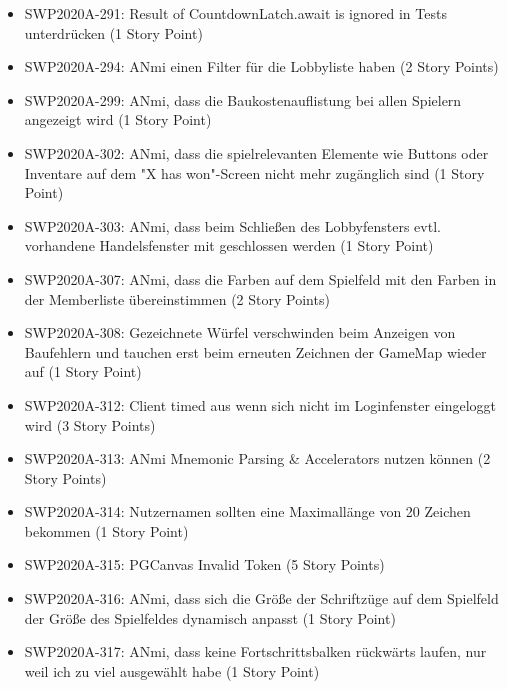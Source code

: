 \documentclass[12pt,a4paper, oneside]{article}
\begin{document}
\begin{itemize}
        \item SWP2020A-291:    \glqq Result of CountdownLatch.await is ignored \grqq{} in Tests unterdrücken (1 Story Point)

        \item SWP2020A-294: ANmi einen Filter für die Lobbyliste haben (2 Story Points)

        \item SWP2020A-299: ANmi, dass die Baukostenauflistung bei allen Spielern angezeigt wird (1 Story Point)

        \item SWP2020A-302: ANmi, dass die spielrelevanten Elemente wie Buttons oder Inventare auf dem "X has won"-Screen nicht mehr zugänglich sind (1 Story Point)

        \item SWP2020A-303: ANmi, dass beim Schließen des Lobbyfensters evtl. vorhandene Handelsfenster mit geschlossen werden (1 Story Point)

        \item SWP2020A-307: ANmi, dass die Farben auf dem Spielfeld mit den Farben in der Memberliste übereinstimmen (2 Story Points)

        \item SWP2020A-308: Gezeichnete Würfel verschwinden beim Anzeigen von Baufehlern und tauchen erst beim erneuten Zeichnen der GameMap wieder auf (1 Story Point)

        \item SWP2020A-312: Client timed aus wenn sich nicht im Loginfenster eingeloggt wird (3 Story Points)

        \item SWP2020A-313: ANmi Mnemonic Parsing & Accelerators nutzen können (2 Story Points)

        \item SWP2020A-314: Nutzernamen sollten eine Maximallänge von 20 Zeichen bekommen (1 Story Point)

        \item SWP2020A-315: PGCanvas Invalid Token (5 Story Points)

        \item SWP2020A-316: ANmi, dass sich die Größe der Schriftzüge auf dem Spielfeld der Größe des Spielfeldes dynamisch anpasst (1 Story Point)

        \item SWP2020A-317: ANmi, dass keine Fortschrittsbalken rückwärts laufen, nur weil ich zu viel ausgewählt habe (1 Story Point)


\end{itemize}
\end{document}
